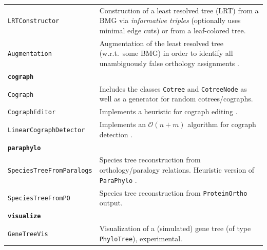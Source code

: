 \documentclass[hidelinks,11pt]{article}
\begin{document}
{\begin{longtable}{| p{4.0cm} | p{10cm} |}
	\texttt{LRTConstructor} & 
	Construction of a least resolved tree (LRT) from a BMG via \emph{informative triples} (optionally uses minimal edge cuts) or from a leaf-colored tree. \\
	\texttt{Augmentation} & 
	Augmentation of the least resolved tree (w.r.t.\ some BMG) in order to identify all unambiguously false orthology assignments \citep{schaller2020}. \\
	\hline
	\multicolumn{2}{|l|}{\textbf{\texttt{cograph}}}\\
	\hline
	\texttt{Cograph} & 
	Includes the classes \texttt{Cotree} and \texttt{CotreeNode} as well as a generator for random cotrees/cographs. \\
	\texttt{CographEditor} & 
	Implements a heuristic for cograph editing \citep{crespelle2019}. \\
	\texttt{LinearCographDetector} & 
	Implements an $\mathcal{O}(n+m)$ algorithm for cograph detection \citep{corneil1985}. \\
	\hline
	\multicolumn{2}{|l|}{\textbf{\texttt{paraphylo}}}\\
	\hline
	\texttt{SpeciesTreeFromParalogs} & 
	Species tree reconstruction from orthology/paralogy relations. Heuristic version of \texttt{ParaPhylo} \cite{hellmuth2015}. \\
	\texttt{SpeciesTreeFromPO} & 
	Species tree reconstruction from \texttt{ProteinOrtho} \cite{lechner2011,lechner2014} output. \\
	\hline
	\multicolumn{2}{|l|}{\textbf{\texttt{visualize}}}\\
	\hline
	\texttt{GeneTreeVis} & 
	Visualization of a (simulated) gene tree (of type \texttt{PhyloTree}), experimental. \\
\end{longtable}
}
\end{document}
